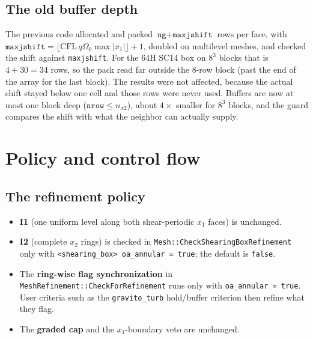 \documentclass[11pt]{article}
\newcommand{\code}[1]{\texttt{#1}}
\newcommand{\fn}[1]{\texttt{\small #1}}
\newcommand{\Om}{\Omega_0}
\newcommand{\qom}{q\Om}
\begin{document}
\subsection{The old buffer depth}
The previous code allocated and packed $\code{ng} + \code{maxjshift}$ rows per face,
with $\code{maxjshift} = \lfloor \mathrm{CFL}\,\qom\max|x_1|\rfloor + 1$, doubled on
multilevel meshes, and checked the shift against \code{maxjshift}. For the 64H SC14 box
on $8^3$ blocks that is $4 + 30 = 34$ rows, so the pack read far outside the 8-row block
(past the end of the array for the last block). The results were not affected, because
the actual shift stayed below one cell and those rows were never used. Buffers are now at
most one block deep ($\code{nrow} \le n_{x2}$), about $4\times$ smaller for $8^3$
blocks, and the guard compares the shift with what the neighbor can actually supply.

\section{Policy and control flow}
\label{sec:policy}

\subsection{The refinement policy}
\begin{itemize}\itemsep2pt
\item \textbf{I1} (one uniform level along both shear-periodic $x_1$ faces) is unchanged.
\item \textbf{I2} (complete $x_2$ rings) is checked in
      \fn{Mesh::CheckShearingBoxRefinement} only with \code{<shearing\_box> oa\_annular =
      true}; the default is \code{false}.
\item The \textbf{ring-wise flag synchronization} in \fn{MeshRefinement::CheckForRefinement}
      runs only with \code{oa\_annular = true}. User criteria such as the
      \code{gravito\_turb} hold/buffer criterion then refine what they flag.
\item The \textbf{graded cap} and the $x_1$-boundary veto are unchanged.
\end{itemize}
\end{document}
